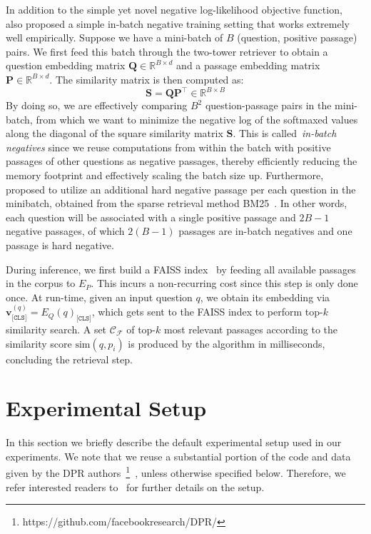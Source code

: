 %
In addition to the simple yet novel negative log-likelihood objective function,~\citet{karpukhin2020dense} also proposed a simple in-batch negative training setting that works extremely well empirically.
%
Suppose we have a mini-batch of $B$ (question, positive passage) pairs.
%
We first feed this batch through the two-tower retriever to obtain a question embedding matrix $\mathbf{Q} \in \mathbb{R}^{B \times d}$ and a passage embedding matrix $\mathbf{P} \in \mathbb{R}^{B \times d}$.
%
The similarity matrix is then computed as:
%
\begin{equation}
\mathbf{S} = \mathbf{Q}\mathbf{P}^\intercal \in \mathbb{R}^{B \times B}
\end{equation}
%
By doing so, we are effectively comparing $B^2$ question-passage pairs in the mini-batch, from which we want to minimize the negative log of the softmaxed values along the diagonal of the square similarity matrix $\mathbf{S}$.
%
This is called~\emph{in-batch negatives} since we reuse computations from within the batch with positive passages of other questions as negative passages, thereby efficiently reducing the memory footprint and effectively scaling the batch size up.
%
Furthermore,~\citet{karpukhin2020dense} proposed to utilize an additional hard negative passage per each question in the minibatch, obtained from the sparse retrieval method BM25~\cite{robertson2009probabilistic}.
%
In other words, each question will be associated with a single positive passage and $2B - 1$ negative passages, of which $2(B - 1)$ passages are in-batch negatives and one passage is hard negative.

%
During inference, we first build a FAISS index~\cite{johnson2019billion} by feeding all available passages in the corpus to $E_P$.
%
This incurs a non-recurring cost since this step is only done once.
%
At run-time, given an input question $q$, we obtain its embedding via $\mathbf{v}^{(q)}_{\texttt{[CLS]}} = E_Q(q)_{\texttt{[CLS]}}$, which gets sent to the FAISS index to perform top-$k$ similarity search.
%
A set $\mathcal{C_F}$ of top-$k$ most relevant passages according to the similarity score $\text{sim}(q, p_i)$ is produced by the algorithm in milliseconds, concluding the retrieval step.



\section{Experimental Setup}\label{sec:exp_setup}
%
In this section we briefly describe the default experimental setup used in our experiments.
%
We note that we reuse a substantial portion of the code and data given by the DPR authors~\footnote{https://github.com/facebookresearch/DPR/}~\cite{karpukhin2020dense}, unless otherwise specified below.
%
Therefore, we refer interested readers to~\cite{karpukhin2020dense} for further details on the setup.

